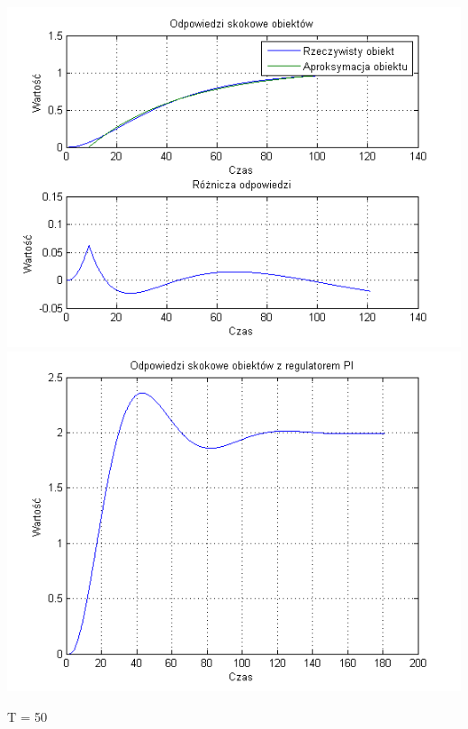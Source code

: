 \documentclass[10pt,a4paper]{article}
\begin{document}
\begin{center}
\includegraphics[scale=1]{images/jeden/skrypt_75.png}\\
\includegraphics[scale=1]{images/jeden/skrypt_76.png}\\
\end{center}
\newpage
T = 50
\end{document}
